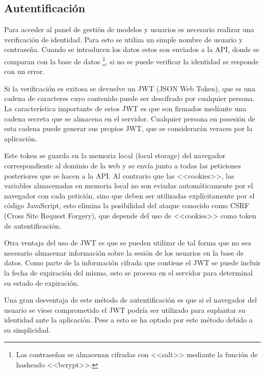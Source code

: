\subsection{Autentificación}

Para acceder al panel de gestión de modelos y usuarios es necesario realizar una
verificación de identidad. Para esto se utiliza un simple nombre de usuario y
contraseña. Cuando se introducen los datos estos son enviados a la API, donde se
comparan con la base de datos \footnote{Las contraseñas se almacenan cifradas
con <<salt>> mediante la función de hasheado <<bcrypt>>.}, si no se puede
verificar la identidad se responde con un error.

Si la verificación es exitosa se devuelve un JWT (JSON Web Token), que es una
cadena de caracteres cuyo contenido puede ser descifrado por cualquier persona.
La característica importante de estos JWT es que son firmados mediante una
cadena secreta que se almacena en el servidor. Cualquier persona en posesión de
esta cadena puede generar sus propios JWT, que se considerarán veraces por la
aplicación.

Este token se guarda en la memoria local (local storage) del navegador
correspondiente al dominio de la web y se envía junto a todas las peticiones
posteriores que se hacen a la API. Al contrario que las <<cookies>>, las
variables almacenadas en memoria local no son eviadas automáticamente por el
navegador con cada petición, sino que deben ser utilizadas explícitamente por el
código JavaScript, esto elimina la posibilidad del ataque conocido como CSRF
(Cross Site Request Forgery), que depende del uso de <<cookies>> como token de
autentificación.

Otra ventaja del uso de JWT es que se pueden utilizar de tal forma que no sea
necesario almacenar información sobre la sesión de los usuarios en la base de
datos. Como parte de la información cifrada que contiene el JWT se puede incluir
la fecha de expiración del mismo, esto se procesa en el servidor para determinal
su estado de expiración.

Una gran desventaja de este método de autentificación es que si el navegador del
usuario se viese comprometido el JWT podría ser utilizado para suplantar su
identidad ante la aplicación. Pese a esto se ha optado por este método debido a
su simplicidad.
